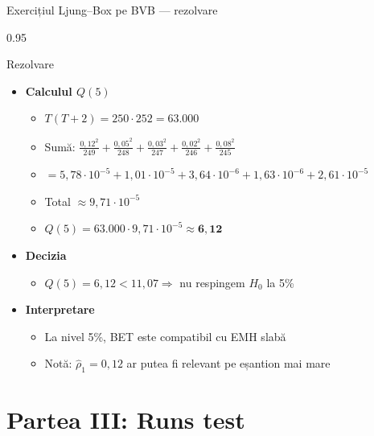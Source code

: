 \documentclass[9pt, aspectratio=169, t]{beamer}
\begin{document}
\begin{frame}[shrink=15]{Exercițiul Ljung--Box pe BVB --- rezolvare}
\begin{cminipage}{0.95\textwidth}
\begin{exampleblock}{Rezolvare}
\begin{itemize}\setlength{\itemsep}{0pt}
    \item \textbf{Calculul $Q(5)$}
    \begin{itemize}\setlength{\itemsep}{0pt}
        \item $T(T+2) = 250 \cdot 252 = 63.000$
        \item Sumă: $\frac{0{,}12^2}{249} + \frac{0{,}05^2}{248} + \frac{0{,}03^2}{247} + \frac{0{,}02^2}{246} + \frac{0{,}08^2}{245}$
        \item $= 5{,}78 \cdot 10^{-5} + 1{,}01 \cdot 10^{-5} + 3{,}64 \cdot 10^{-6} + 1{,}63 \cdot 10^{-6} + 2{,}61 \cdot 10^{-5}$
        \item Total $\approx 9{,}71 \cdot 10^{-5}$
        \item $Q(5) = 63.000 \cdot 9{,}71 \cdot 10^{-5} \approx \mathbf{6{,}12}$
    \end{itemize}
    \item \textbf{Decizia}
    \begin{itemize}\setlength{\itemsep}{0pt}
        \item $Q(5) = 6{,}12 < 11{,}07 \Rightarrow$ nu respingem $H_0$ la 5\%
    \end{itemize}
    \item \textbf{Interpretare}
    \begin{itemize}\setlength{\itemsep}{0pt}
        \item La nivel 5\%, BET este compatibil cu EMH slabă
        \item Notă: $\hat\rho_1 = 0{,}12$ ar putea fi relevant pe eșantion mai mare
    \end{itemize}
\end{itemize}
\end{exampleblock}
\end{cminipage}
\end{frame}

\section{Partea III: Runs test}
\end{document}

